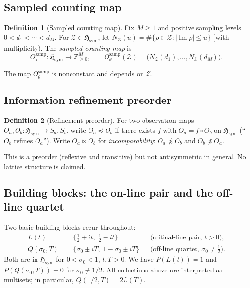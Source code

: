 \documentclass[12pt]{amsart}
\theoremstyle{definition}
\newtheorem{definition}{Definition}[section]
\theoremstyle{remark}
\theoremstyle{plain}
\newcommand{\Hsym}{\mathfrak{H}_{\mathrm{sym}}}
\newcommand{\Otheta}{O_{\theta}^{\mathrm{samp}}}
\newcommand{\im}{\operatorname{Im}}
\newcommand{\NZ}{N_{\mathcal{Z}}}
\newcommand{\ZZ}{\mathbb{Z}}
\newcommand{\incomp}{\mathbin{\bowtie}}
\begin{document}
\subsection{Sampled counting map}

\begin{definition}[Sampled counting map]
\label{def:Otheta}
Fix $M \geq 1$ and positive sampling levels $0 < d_1 < \cdots < d_M$.
For $\mathcal{Z} \in \Hsym$, let
$\NZ(u) = \#\{\rho \in \mathcal{Z} : |\im\rho| \leq u\}$
(with multiplicity).
The \emph{sampled counting map} is
\[
  \Otheta : \Hsym \longrightarrow \ZZ_{\geq 0}^M, \qquad
  \Otheta(\mathcal{Z}) = \bigl(\NZ(d_1), \ldots, \NZ(d_M)\bigr).
\]
\end{definition}

The map $\Otheta$ is nonconstant and depends on $\mathcal{Z}$.

\subsection{Information refinement preorder}

\begin{definition}[Refinement preorder]
\label{def:preorder}
For two observation maps $O_a, O_b : \Hsym \to S_a, S_b$, write
$O_a \preceq O_b$ if there exists $f$ with $O_a = f \circ O_b$ on $\Hsym$
(``$O_b$ refines $O_a$'').  Write $O_a \incomp O_b$ for
\emph{incomparability}: $O_a \npreceq O_b$ and $O_b \npreceq O_a$.
\end{definition}

This is a preorder (reflexive and transitive) but not antisymmetric in
general.  No lattice structure is claimed.

\subsection{Building blocks: the on-line pair and the off-line quartet}

Two basic building blocks recur throughout:
\begin{align*}
  L(t) &= \{{\textstyle\frac{1}{2}} + it,\; {\textstyle\frac{1}{2}} - it\}
         && \text{(critical-line pair, }t > 0\text{)},\\
  Q(\sigma_0, T) &= \{\sigma_0 \pm iT,\; 1-\sigma_0 \pm iT\}
         && \text{(off-line quartet, }\sigma_0 \neq {\textstyle\frac{1}{2}}\text{)}.
\end{align*}
Both are in $\Hsym$ for $0 < \sigma_0 < 1$, $t, T > 0$.
We have $P(L(t)) = 1$ and $P(Q(\sigma_0,T)) = 0$ for $\sigma_0 \neq 1/2$.
All collections above are interpreted as multisets; in particular, $Q(1/2,T) = 2L(T)$.
\end{document}
